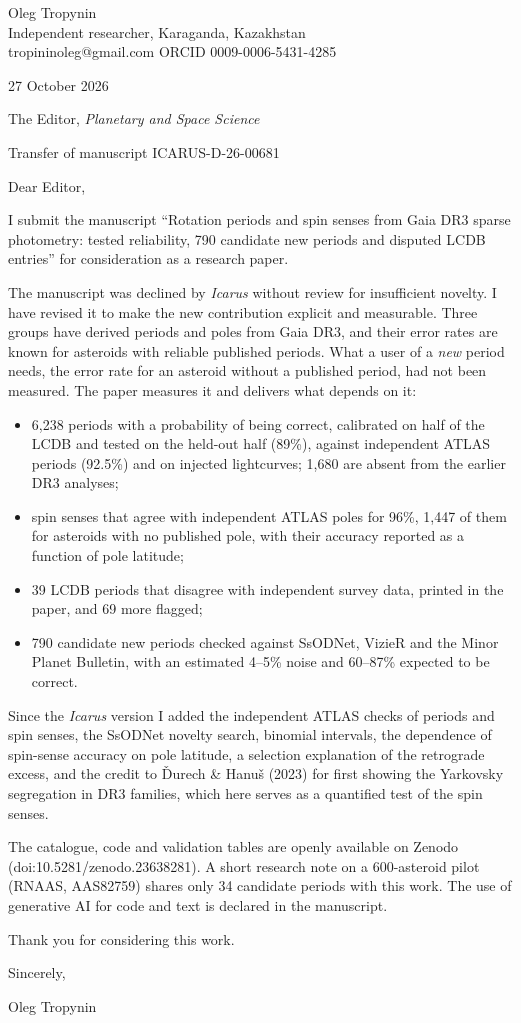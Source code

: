 \documentclass[12pt,a4paper]{article}
\begin{document}
Oleg Tropynin\\
Independent researcher, Karaganda, Kazakhstan\\
tropininoleg@gmail.com \quad ORCID 0009-0006-5431-4285

27 October 2026

The Editor, \textit{Planetary and Space Science}

Transfer of manuscript ICARUS-D-26-00681

Dear Editor,

I submit the manuscript ``Rotation periods and spin senses from Gaia DR3 sparse photometry: tested reliability, 790 candidate new periods and disputed LCDB entries'' for consideration as a research paper.

The manuscript was declined by \textit{Icarus} without review for insufficient novelty. I have revised it to make the new contribution explicit and measurable. Three groups have derived periods and poles from Gaia DR3, and their error rates are known for asteroids with reliable published periods. What a user of a \emph{new} period needs, the error rate for an asteroid without a published period, had not been measured. The paper measures it and delivers what depends on it:
\begin{itemize}[topsep=0pt,itemsep=2pt]
\item 6,238 periods with a probability of being correct, calibrated on half of the LCDB and tested on the held-out half (89\%), against independent ATLAS periods (92.5\%) and on injected lightcurves; 1,680 are absent from the earlier DR3 analyses;
\item spin senses that agree with independent ATLAS poles for 96\%, 1,447 of them for asteroids with no published pole, with their accuracy reported as a function of pole latitude;
\item 39 LCDB periods that disagree with independent survey data, printed in the paper, and 69 more flagged;
\item 790 candidate new periods checked against SsODNet, VizieR and the Minor Planet Bulletin, with an estimated 4--5\% noise and 60--87\% expected to be correct.
\end{itemize}

Since the \textit{Icarus} version I added the independent ATLAS checks of periods and spin senses, the SsODNet novelty search, binomial intervals, the dependence of spin-sense accuracy on pole latitude, a selection explanation of the retrograde excess, and the credit to \v{D}urech \& Hanu\v{s} (2023) for first showing the Yarkovsky segregation in DR3 families, which here serves as a quantified test of the spin senses.

The catalogue, code and validation tables are openly available on Zenodo (doi:10.5281/zenodo.23638281). A short research note on a 600-asteroid pilot (RNAAS, AAS82759) shares only 34 candidate periods with this work. The use of generative AI for code and text is declared in the manuscript.

Thank you for considering this work.

Sincerely,

Oleg Tropynin
\end{document}
